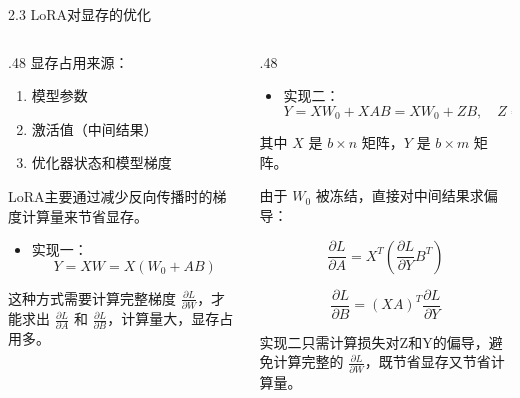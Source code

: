 \documentclass[aspectratio=169,10pt]{beamer}
\begin{document}
\begin{frame}[fragile,shrink=12]{2.3 LoRA对显存的优化}
\footnotesize
\begin{columns}[T,onlytextwidth]
  \begin{column}{.48\textwidth}
    显存占用来源：
    \begin{enumerate}
    \item 模型参数
    \item 激活值（中间结果）
    \item 优化器状态和模型梯度
    \end{enumerate}
    
    LoRA主要通过减少反向传播时的梯度计算量来节省显存。
    
    \begin{itemize}
    \item
      实现一： \[Y = XW = X(W_0 + AB)\]
    \end{itemize}
    
    这种方式需要计算完整梯度 \(\frac{\partial L}{\partial W}\)，才能求出 \(\frac{\partial L}{\partial A}\) 和 \(\frac{\partial L}{\partial B}\)，计算量大，显存占用多。
  \end{column}
  \begin{column}{.48\textwidth}
    \begin{itemize}
    \item
      实现二： \[Y = XW_0 + XAB = XW_0 + ZB, \quad Z = XA\]
    \end{itemize}
    
    其中 \(X\) 是 \(b \times n\) 矩阵，\(Y\) 是 \(b \times m\) 矩阵。
    
    由于 \(W_0\) 被冻结，直接对中间结果求偏导：
    
    \[\frac{\partial L}{\partial A} = X^T \left(\frac{\partial L}{\partial Y} B^T\right)\]
    
    \[\frac{\partial L}{\partial B} = (XA)^T \frac{\partial L}{\partial Y}\]
    
    实现二只需计算损失对Z和Y的偏导，避免计算完整的 \(\frac{\partial L}{\partial W}\)，既节省显存又节省计算量。
  \end{column}
\end{columns}
\end{frame}
\end{document}
